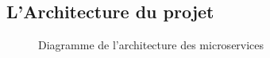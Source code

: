 \documentclass[a4paper, 11pt, openany]{report}
\begin{document}
\newpage



\subsection{L'Architecture du projet}

\begin{figure}[H] %
\centering
{} %
\caption{Diagramme de l'architecture des microservices}
\label{fig:microservices_architecture}
\end{figure}
\end{document}
